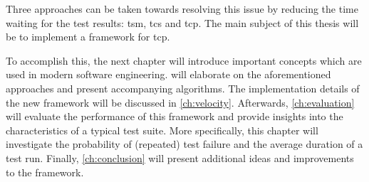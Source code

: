 \noindent Three approaches can be taken towards resolving this issue by reducing the time waiting for the test results: \acrfull{tsm}, \acrfull{tcs} and \acrfull{tcp}. The main subject of this thesis will be to implement a framework for \acrshort{tcp}.

\clearpage

\noindent To accomplish this, the next chapter will introduce important concepts which are used in modern software engineering.  will elaborate on the aforementioned approaches and present accompanying algorithms. The implementation details of the new framework will be discussed in \cref{ch:velocity}. Afterwards, \cref{ch:evaluation} will evaluate the performance of this framework and provide insights into the characteristics of a typical test suite. More specifically, this chapter will investigate the probability of (repeated) test failure and the average duration of a test run. Finally, \cref{ch:conclusion} will present additional ideas and improvements to the framework.